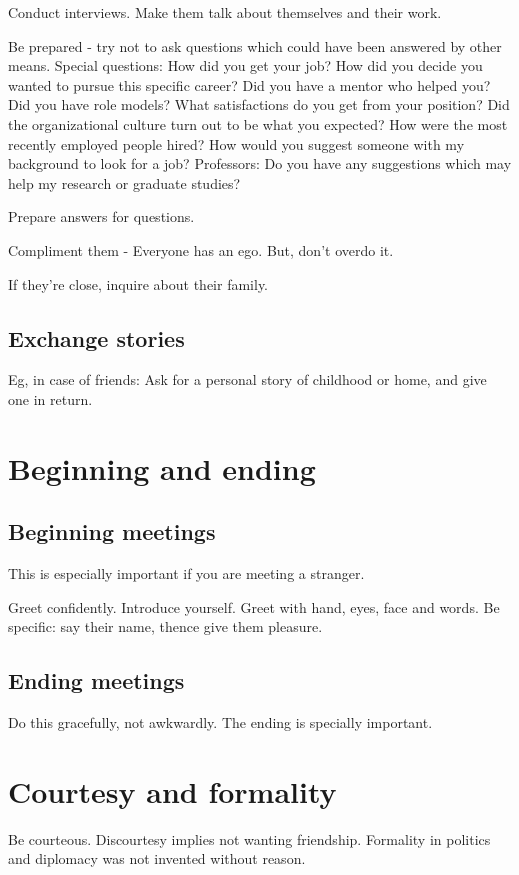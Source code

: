 \documentclass[oneside, article]{memoir}
\begin{document}
Conduct interviews. Make them talk about themselves and their work.

Be prepared - try not to ask questions which could have been answered by other means. Special questions:
\subitem How did you get your job?
\subitem How did you decide you wanted to pursue this specific career?
\subitem Did you have a mentor who helped you? Did you have role models?
\subitem What satisfactions do you get from your position?
\subitem Did the organizational culture turn out to be what you expected?
\subitem How were the most recently employed people hired?
\subitem How would you suggest someone with my background to look for a job?
\subitem Professors: Do you have any suggestions which may help my research or graduate studies?

Prepare answers for questions.

Compliment them - Everyone has an ego. But, don't overdo it.

If they're close, inquire about their family.

\section{Exchange stories}
Eg, in case of friends: Ask for a personal story of childhood or home, and give one in return.

\chapter{Beginning and ending}
\section{Beginning meetings}
This is especially important if you are meeting a stranger.

Greet confidently. Introduce yourself. Greet with hand, eyes, face and words. Be specific: say their name, thence give them pleasure.

\section{Ending meetings}
Do this gracefully, not awkwardly. The ending is specially important.

\chapter{Courtesy and formality}
Be courteous. Discourtesy implies not wanting friendship. Formality in politics and diplomacy was not invented without reason.
\end{document}
